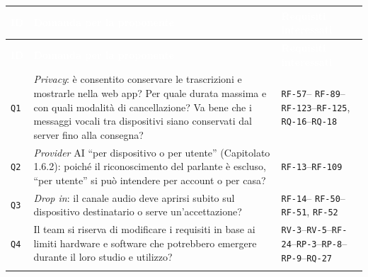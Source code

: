 \documentclass[12pt,a4paper]{article}
\newcommand{\thc}[1]{\textcolor{white}{\textbf{#1}}}
\newcommand{\rl}{\\ \arrayrulecolor{bfline}\hline}
\begin{document}
\begin{longtable}{>{\raggedright\arraybackslash}p{}>{\raggedright\arraybackslash}p{}>{\raggedright\arraybackslash}p{}}
\rowcolor{bfblue}\thc{ID} & \thc{Domanda per la proponente} & \thc{Requisiti interessati} \\
\endfirsthead
\rowcolor{bfblue}\thc{ID} & \thc{Domanda per la proponente} & \thc{Requisiti interessati} \\
\endhead
\texttt{Q1} & \emph{Privacy}: è consentito conservare le trascrizioni e mostrarle nella web app? Per quale durata massima e con quali modalità di cancellazione? Va bene che i messaggi vocali tra dispositivi siano conservati dal server fino alla consegna? &  \texttt{RF-57}-- \texttt{RF-89}--\texttt{RF-123}--\texttt{RF-125}, \texttt{RQ-16}--\texttt{RQ-18} \rl

\texttt{Q2} & \emph{Provider} AI ``per dispositivo o per utente'' (Capitolato 1.6.2): poiché il riconoscimento del parlante è escluso, ``per utente'' si può intendere per account o per casa? &  \texttt{RF-13}--\texttt{RF-109} \rl

\texttt{Q3} & \emph{Drop in}: il canale audio deve aprirsi subito sul dispositivo destinatario o serve un'accettazione? &  \texttt{RF-14}-- \texttt{RF-50}--\texttt{RF-51}, \texttt{RF-52} \rl

\texttt{Q4} & Il team si riserva di modificare i requisiti in base ai limiti hardware e software che potrebbero emergere durante il loro studio e utilizzo? & \texttt{RV-3}--\texttt{RV-5}--\texttt{RF-24}--\texttt{RP-3}--\texttt{RP-8}--\texttt{RP-9}--\texttt{RQ-27} \rl

\end{longtable}
\end{document}
